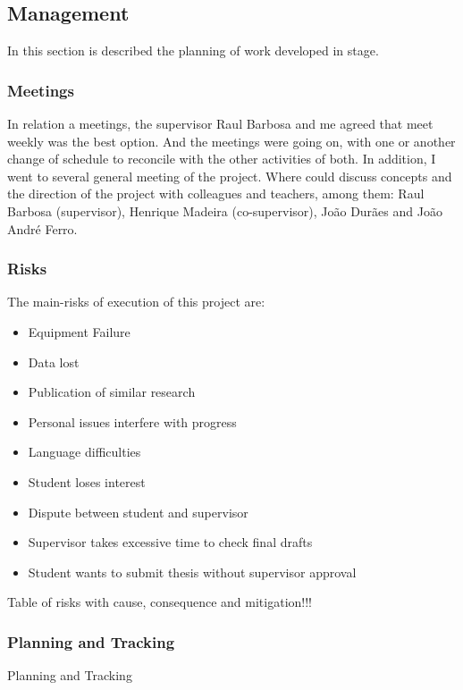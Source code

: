 \newpage
\subsection{Management}

In this section is described the planning of work developed in stage.

\subsubsection{Meetings}
In relation a meetings, the supervisor Raul Barbosa and me agreed that meet weekly was the best option. And the meetings were going on, with one or another change of schedule to reconcile with the other activities of both. In addition, I went to several general meeting of the project. Where could discuss concepts and the direction of the project with colleagues and teachers, among them: Raul Barbosa (supervisor), Henrique Madeira (co-supervisor), João Durães and João André Ferro.

\subsubsection{Risks}

The main-risks of execution of this project are:

\begin{itemize}
	\item Equipment Failure
	\item Data lost
	\item Publication of similar research
	\item Personal issues interfere with progress
	\item Language difficulties
	\item Student loses interest
	\item Dispute between student and supervisor
	\item Supervisor takes excessive time to check final drafts
	\item Student wants to submit thesis without supervisor approval
\end{itemize}

Table of risks with cause, consequence and mitigation!!!

\subsubsection{Planning and Tracking}
Planning and Tracking

